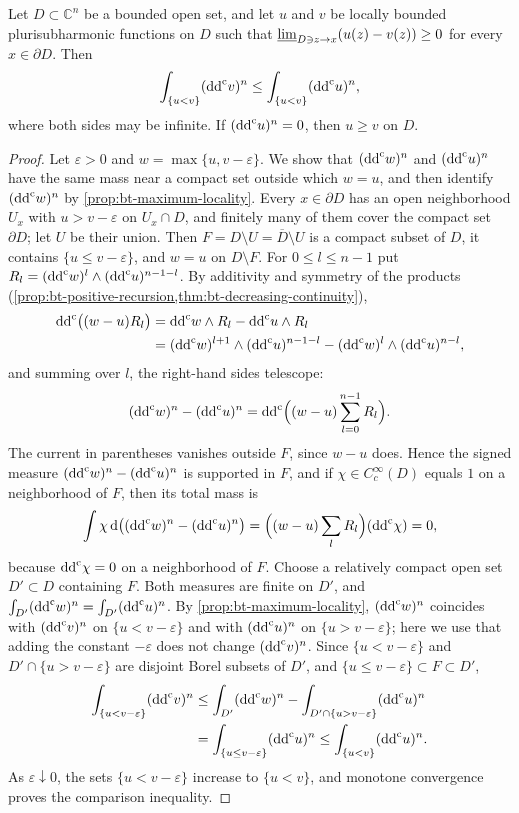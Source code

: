 \begin{theorem}\label{thm:bt-comparison}
Let $D\subset\mathbb{C}^n$ be a bounded open set, and let $u$ and $v$ be locally bounded plurisubharmonic functions on $D$ such that $\varliminf_{D\ni z\to x}(u(z)-v(z))\ge0$ for every $x\in\partial D$. Then
\[
 \int_{\{u<v\}}(\mathrm{dd}^{\mathrm{c}} v)^n\le\int_{\{u<v\}}(\mathrm{dd}^{\mathrm{c}} u)^n,
\]
where both sides may be infinite. If $(\mathrm{dd}^{\mathrm{c}} u)^n=0$, then $u\ge v$ on $D$.
\end{theorem}
\begin{proof}
Let $\varepsilon>0$ and $w=\max\{u,v-\varepsilon\}$. We show that $(\mathrm{dd}^{\mathrm{c}} w)^n$ and $(\mathrm{dd}^{\mathrm{c}} u)^n$ have the same mass near a compact set outside which $w=u$, and then identify $(\mathrm{dd}^{\mathrm{c}} w)^n$ by \cref{prop:bt-maximum-locality}. Every $x\in\partial D$ has an open neighborhood $U_x$ with $u>v-\varepsilon$ on $U_x\cap D$, and finitely many of them cover the compact set $\partial D$; let $U$ be their union. Then $F=D\setminus U=\overline D\setminus U$ is a compact subset of $D$, it contains $\{u\le v-\varepsilon\}$, and $w=u$ on $D\setminus F$. For $0\le l\le n-1$ put $R_l=(\mathrm{dd}^{\mathrm{c}} w)^l\wedge(\mathrm{dd}^{\mathrm{c}} u)^{n-1-l}$. By additivity and symmetry of the products (\cref{prop:bt-positive-recursion,thm:bt-decreasing-continuity}),
\[
 \begin{aligned}
 \mathrm{dd}^{\mathrm{c}}\bigl((w-u)R_l\bigr)&=\mathrm{dd}^{\mathrm{c}} w\wedge R_l-\mathrm{dd}^{\mathrm{c}} u\wedge R_l\\
 &=(\mathrm{dd}^{\mathrm{c}} w)^{l+1}\wedge(\mathrm{dd}^{\mathrm{c}} u)^{n-1-l}-(\mathrm{dd}^{\mathrm{c}} w)^l\wedge(\mathrm{dd}^{\mathrm{c}} u)^{n-l},
 \end{aligned}
\]
and summing over $l$, the right-hand sides telescope:
\[
 (\mathrm{dd}^{\mathrm{c}} w)^n-(\mathrm{dd}^{\mathrm{c}} u)^n
 =\mathrm{dd}^{\mathrm{c}}\Bigl((w-u)\sum_{l=0}^{n-1}R_l\Bigr).
\]
The current in parentheses vanishes outside $F$, since $w-u$ does. Hence the signed measure $(\mathrm{dd}^{\mathrm{c}} w)^n-(\mathrm{dd}^{\mathrm{c}} u)^n$ is supported in $F$, and if $\chi\in C^\infty_c(D)$ equals $1$ on a neighborhood of $F$, then its total mass is
\[
 \int\chi\,\mathrm d\bigl((\mathrm{dd}^{\mathrm{c}} w)^n-(\mathrm{dd}^{\mathrm{c}} u)^n\bigr)=\Bigl((w-u)\sum_lR_l\Bigr)(\mathrm{dd}^{\mathrm{c}}\chi)=0,
\]
because $\mathrm{dd}^{\mathrm{c}}\chi=0$ on a neighborhood of $F$. Choose a relatively compact open set $D'\subset D$ containing $F$. Both measures are finite on $D'$, and $\int_{D'}(\mathrm{dd}^{\mathrm{c}} w)^n=\int_{D'}(\mathrm{dd}^{\mathrm{c}} u)^n$. By \cref{prop:bt-maximum-locality}, $(\mathrm{dd}^{\mathrm{c}} w)^n$ coincides with $(\mathrm{dd}^{\mathrm{c}} v)^n$ on $\{u<v-\varepsilon\}$ and with $(\mathrm{dd}^{\mathrm{c}} u)^n$ on $\{u>v-\varepsilon\}$; here we use that adding the constant $-\varepsilon$ does not change $(\mathrm{dd}^{\mathrm{c}} v)^n$. Since $\{u<v-\varepsilon\}$ and $D'\cap\{u>v-\varepsilon\}$ are disjoint Borel subsets of $D'$, and $\{u\le v-\varepsilon\}\subset F\subset D'$,
\[
 \begin{aligned}
 \int_{\{u<v-\varepsilon\}}(\mathrm{dd}^{\mathrm{c}} v)^n
 &\le\int_{D'}(\mathrm{dd}^{\mathrm{c}} w)^n
       -\int_{D'\cap\{u>v-\varepsilon\}}(\mathrm{dd}^{\mathrm{c}} u)^n\\
 &=\int_{\{u\le v-\varepsilon\}}(\mathrm{dd}^{\mathrm{c}} u)^n
 \le\int_{\{u<v\}}(\mathrm{dd}^{\mathrm{c}} u)^n.
 \end{aligned}
\]
As $\varepsilon\downarrow0$, the sets $\{u<v-\varepsilon\}$ increase to $\{u<v\}$, and monotone convergence proves the comparison inequality.


\end{proof}
